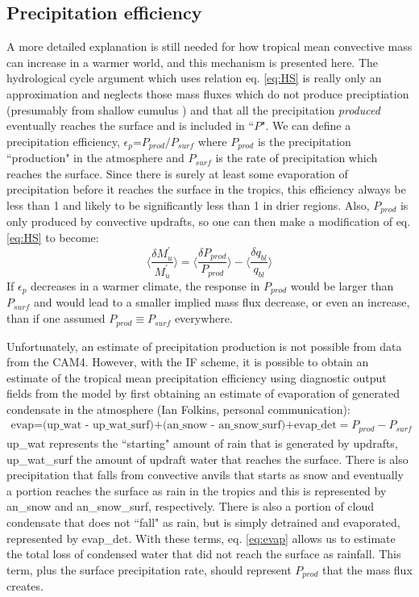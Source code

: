 \documentclass[letterpaper,12pt,titlepage,oneside,final]{book}
\begin{document}
\subsection{Precipitation efficiency}
A more detailed explanation is still needed for how tropical mean convective mass can increase in a warmer world, and this mechanism is presented here. The hydrological cycle argument which uses relation eq. \ref{eq:HS} is really only an approximation and neglects those mass fluxes which do not produce preciptiation (presumably from shallow cumulus \citep{held_robust_2006}) and that all the precipitation \textit{produced} eventually reaches the surface and is included in ``$P$". We can define a precipitation efficiency, $\epsilon_{p}$=$P_{prod}/P_{surf}$ where $P_{prod}$ is the precipitation ``production" in the atmosphere and $P_{surf}$ is the rate of precipitation which reaches the surface. Since there is surely at least some evaporation of precipitation before it reaches the surface in the tropics, this efficiency always be less than 1 and likely to be significantly less than 1 in drier regions. Also, $P_{prod}$ is only produced by convective updrafts, so one can then make a modification of eq. \ref{eq:HS} to become: 
\begin{equation}\label{eq:HS1}
\Bigg\langle\frac{\delta{M^{'}_{u}}}{M^{'}_{u}}\Bigg\rangle=\Bigg\langle\frac{\delta{P_{prod}}}{P_{prod}}\Bigg\rangle-\Bigg\langle\frac{\delta{q_{bl}}}{q_{bl}}\Bigg\rangle
\end{equation}
If $\epsilon_{p}$ decreases in a warmer climate, the response in $P_{prod}$ would be larger than $P_{surf}$ and would lead to a smaller implied mass flux decrease, or even an increase, than if one assumed $P_{prod}\equiv{P_{surf}}$ everywhere. 

Unfortunately, an estimate of precipitation production is not possible from data from the CAM4. However, with the IF scheme, it is possible to obtain an estimate of the tropical mean precipitation efficiency using diagnostic output fields from the model by first obtaining an estimate of evaporation of generated condensate in the atmosphere (Ian Folkins, personal communication):
\begin{align}\label{eq:evap}
\text{evap=(up\_wat - up\_wat\_surf)+(an\_snow - an\_snow\_surf)+evap\_det}=P_{prod}-P_{surf}
\end{align}
up\_wat represents the ``starting" amount of rain that is generated by updrafts, up\_wat\_surf the amount of updraft water that reaches the surface. There is also precipitation that falls from convective anvils that starts as snow and eventually a portion reaches the surface as rain in the tropics and this is represented by an\_snow and an\_snow\_surf, respectively. There is also a portion of cloud condensate that does not ``fall" as rain, but is simply detrained and evaporated, represented by evap\_det. With these terms, eq. \ref{eq:evap} allows us to estimate the total loss of condensed water that did not reach the surface as rainfall. This term, plus the surface precipitation rate, should represent $P_{prod}$ that the mass flux creates. 
\end{document}
